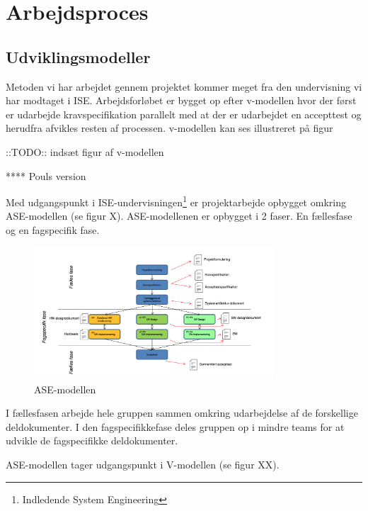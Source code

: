 \chapter{Arbejdsproces}

\section{Udviklingsmodeller}

Metoden vi har arbejdet gennem projektet kommer meget fra den undervisning vi har modtaget i ISE. %
Arbejdsforløbet er bygget op efter v-modellen hvor der først er udarbejde kravspecifikation parallelt med at der er udarbejdet en accepttest og herudfra afvikles resten af processen. v-modellen kan ses illustreret på figur %


\begin{large}
::TODO:: indsæt figur af v-modellen
\end{large}



**** Pouls version

Med udgangspunkt i ISE-undervisningen\footnote{Indledende System Engineering} er projektarbejde opbygget omkring ASE-modellen (se figur X). ASE-modellenen er opbygget i 2 faser. En fællesfase og en fagspecifik fase. 


\begin{figure}[htbp]
  \centering
    \includegraphics[width=0.8\textwidth]{billeder/ASE-modellen}
    \caption{ASE-modellen}
    \label{fig:ASE_model}
\end{figure}

I fællesfasen arbejde hele gruppen sammen omkring udarbejdelse af de forskellige deldokumenter. 
I den fagspecifikkefase deles gruppen op i mindre teams for at udvikle de fagspecifikke deldokumenter. 

ASE-modellen tager udgangspunkt i V-modellen (se figur XX).   

